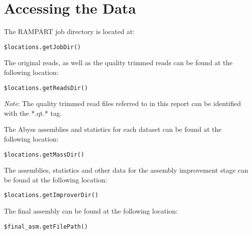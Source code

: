 \documentclass{amsart}
\begin{document}
\newpage
\section{Accessing the Data}

The RAMPART job directory is located at:

\begin{lstlisting}[label=path:1]
$locations.getJobDir()
\end{lstlisting}

The original reads, as well as the quality trimmed reads can be found at the following location:

\begin{lstlisting}[label=path:1]
$locations.getReadsDir()
\end{lstlisting}

\emph{Note}: The quality trimmed read files referred to in this report can be identified with the *.qt.* tag.

The Abyss assemblies and statistics for each dataset can be found at the following location:

\begin{lstlisting}[label=path:1]
$locations.getMassDir()
\end{lstlisting}


The assemblies, statistics and other data for the assembly improvement stage can be found at the following location:

\begin{lstlisting}[label=path:1]
$locations.getImproverDir()
\end{lstlisting} 


The final assembly can be found at the following location:

\begin{lstlisting}[label=path:1]
$final_asm.getFilePath()
\end{lstlisting}
\end{document}

